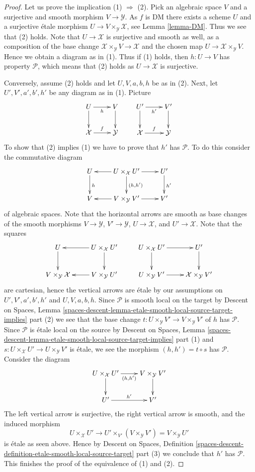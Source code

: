 \documentclass[10pt,a4paper]{amsart}
\theoremstyle{plain}
\theoremstyle{definition}
\theoremstyle{remark}
\numberwithin{equation}{subsection}
\begin{document}
\begin{proof}
Let us prove the implication (1) $\Rightarrow$ (2). Pick an algebraic
space $V$ and a surjective and smooth morphism $V \to \mathcal{Y}$.
As $f$ is DM there exists a scheme $U$ and a surjective \'etale morphism
$U \to V \times_\mathcal{Y} \mathcal{X}$, see
Lemma \ref{lemma-DM}. Thus we see that (2) holds.
Note that $U \to \mathcal{X}$ is surjective and smooth as well, as a
composition of the base change
$\mathcal{X} \times_\mathcal{Y} V \to \mathcal{X}$ and the chosen
map $U \to \mathcal{X} \times_\mathcal{Y} V$. Hence we obtain a
diagram as in (1). Thus if (1) holds, then $h : U \to V$ has property
$\mathcal{P}$, which means that (2) holds as $U \to \mathcal{X}$ is surjective.

\medskip\noindent
Conversely, assume (2) holds and let $U, V, a, b, h$ be as in (2).
Next, let $U', V', a', b', h'$ be any diagram as in (1).
Picture
$$
\xymatrix{
U \ar[d] \ar[r]_h & V \ar[d] \\
\mathcal{X} \ar[r]^f & \mathcal{Y}
}
\quad\quad
\xymatrix{
U' \ar[d] \ar[r]_{h'} & V' \ar[d] \\
\mathcal{X} \ar[r]^f & \mathcal{Y}
}
$$
To show that (2) implies (1) we have to prove that $h'$ has $\mathcal{P}$.
To do this consider the commutative diagram
$$
\xymatrix{
U \ar[d]^h &
U \times_\mathcal{X} U' \ar[l] \ar[d]^{(h, h')} \ar[r] &
U' \ar[d]^{h'} \\
V &
V \times_\mathcal{Y} V' \ar[l] \ar[r] &
V'
}
$$
of algebraic spaces. Note that the horizontal arrows are
smooth as base changes of the smooth morphisms
$V \to \mathcal{Y}$, $V' \to \mathcal{Y}$, $U \to \mathcal{X}$, and
$U' \to \mathcal{X}$. Note that the squares
$$
\xymatrix{
U \ar[d] & U \times_\mathcal{X} U' \ar[l] \ar[d] &
U \times_\mathcal{X} U' \ar[d] \ar[r] & U' \ar[d] \\
V \times_\mathcal{Y} \mathcal{X} &
V \times_\mathcal{Y} U' \ar[l] &
U \times_\mathcal{Y} V' \ar[r] &
\mathcal{X} \times_\mathcal{Y} V'
}
$$
are cartesian, hence the vertical arrows are \'etale by our assumptions on
$U', V', a', b', h'$ and $U, V, a, b, h$.
Since $\mathcal{P}$ is smooth local on the target by
Descent on Spaces, Lemma
\ref{spaces-descent-lemma-etale-smooth-local-source-target-implies} part (2)
we see that the base change
$t : U \times_\mathcal{Y} V' \to V \times_\mathcal{Y} V'$ of $h$
has $\mathcal{P}$. Since $\mathcal{P}$ is \'etale local on the source by
Descent on Spaces, Lemma
\ref{spaces-descent-lemma-etale-smooth-local-source-target-implies} part (1)
and $s : U \times_\mathcal{X} U' \to U \times_\mathcal{Y} V'$ is \'etale,
we see the morphism $(h, h') = t \circ s$ has $\mathcal{P}$.
Consider the diagram
$$
\xymatrix{
U \times_\mathcal{X} U' \ar[r]_{(h, h')} \ar[d] &
V \times_\mathcal{Y} V' \ar[d] \\
U' \ar[r]^{h'} & V'
}
$$
The left vertical arrow is surjective, the right vertical arrow is smooth, and
the induced morphism
$$
U \times_\mathcal{X} U'
\longrightarrow
U' \times_{V'} (V \times_\mathcal{Y} V') = V \times_\mathcal{Y} U'
$$
is \'etale as seen above. Hence by
Descent on Spaces, Definition
\ref{spaces-descent-definition-etale-smooth-local-source-target} part (3)
we conclude that $h'$ has $\mathcal{P}$. This finishes the proof of the
equivalence of (1) and (2).


\end{proof}
\end{document}
